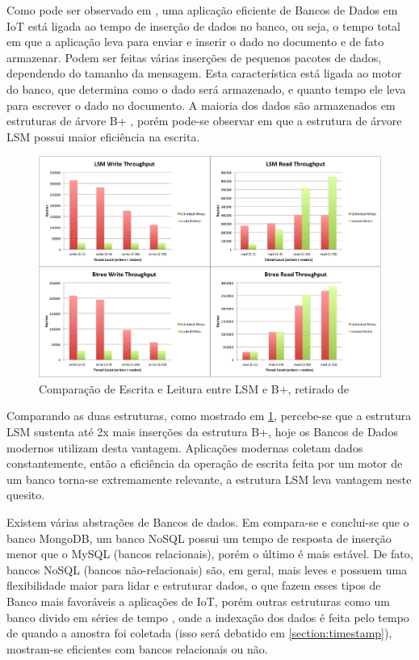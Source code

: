 Como pode ser observado em \cite{Damodaran}, uma aplicação eficiente de Bancos de Dados em IoT está ligada ao tempo de inserção de dados no banco, ou seja,  o tempo total em que a aplicação leva para enviar e inserir o dado no documento e de fato armazenar. Podem ser feitas várias inserções de pequenos pacotes de dados, dependendo do tamanho da mensagem. Esta característica está ligada ao motor do banco, que determina como o dado será armazenado, e quanto tempo ele leva para escrever o dado no documento. A maioria dos dados são armazenados em estruturas de árvore B+ \cite{b-tree}, porém pode-se observar em \cite{Damodaran} que a estrutura de árvore LSM  \cite{O'Neal-Gawlick-Cheng} possui maior eficiência na escrita.


\begin{figure}[h!]
\centering
\includegraphics[width=14cm]{./02_Capitulos/02_Cap3/figures/LSM_btree}
\caption{Comparação de Escrita e Leitura entre LSM e B+, retirado de \cite{btrees-vs-lsmtrees}}
\label{fig:3.3.5/b-lsm}
\end{figure}

Comparando as duas estruturas, como mostrado em \ref{fig:3.3.5/b-lsm}, percebe-se que a estrutura LSM sustenta até 2x mais inserções da estrutura B+, hoje os Bancos de Dados modernos utilizam desta vantagem. Aplicações modernas coletam dados constantemente, então a eficiência da operação de escrita feita por um motor de um banco torna-se extremamente relevante, a estrutura LSM leva vantagem neste quesito.

Existem várias abstrações de Bancos de dados. Em \cite{Rautmare-Bhalerao} compara-se e conclui-se que o banco MongoDB, um banco NoSQL possui um tempo de resposta de inserção menor que o MySQL (bancos relacionais), porém o último é mais estável. De fato, bancos NoSQL (bancos não-relacionais) são, em geral, mais leves e possuem uma flexibilidade maior para lidar e estruturar dados, o que fazem esses tipos de Banco mais favoráveis a aplicações de IoT, porém outras estruturas como um banco divido em séries de tempo \cite{timeseries} , onde a indexação dos dados é feita pelo tempo de quando a amostra foi coletada (isso será debatido em \ref{section:timestamp}), mostram-se eficientes com bancos relacionais ou não.

